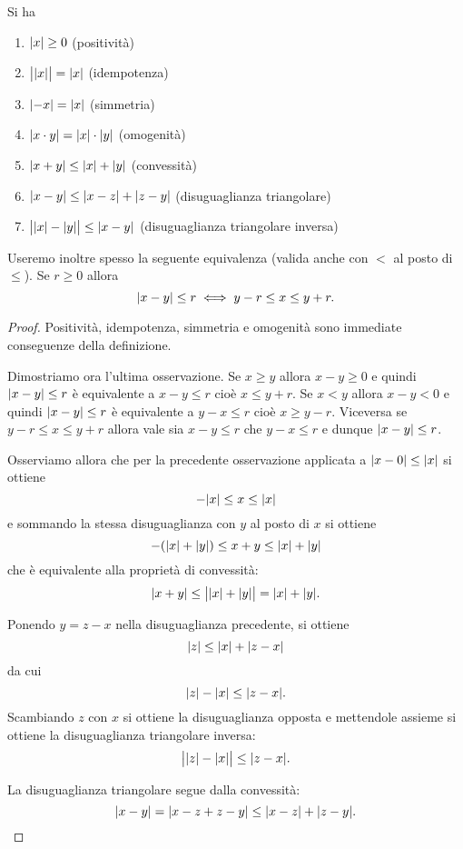 \begin{proposition}
\mymark{**}
Si ha
\begin{enumerate}
\item ${\left|x\right|}\ge 0$ (positività)
\item $\big\lvert{\left|x\right|}\big\rvert = {\left|x\right|}$ (idempotenza)
\item ${\left|-x\right|} = {\left|x\right|}$ (simmetria)
\item ${\left|x\cdot y\right|} = {\left|x\right|}\cdot {\left|y\right|}$ (omogenità)
\item ${\left|x+y\right|} \le {\left|x\right|} + {\left|y\right|}$ (convessità)
\item ${\left|x-y\right|} \le {\left|x-z\right|} + {\left|z-y\right|}$ (disuguaglianza triangolare)
\item $\big\lvert{\left|x\right|}-{\left|y\right|}\big\rvert \le {\left|x-y\right|}$ (disuguaglianza triangolare inversa)
\end{enumerate}
Useremo inoltre spesso la seguente equivalenza (valida
anche con $<$ al posto di $\le$). Se $r\ge 0$ allora
\[
  {\left|x-y\right|} \le r
  \iff
  y - r \le x \le y + r.
\]
\end{proposition}
%
\begin{proof}
\mymark{*}
Positività, idempotenza, simmetria e omogenità sono immediate conseguenze della definizione.

Dimostriamo ora l'ultima osservazione.
Se $x\ge y$ allora $x-y\ge 0$ e quindi ${\left|x-y\right|} \le r$ è
equivalente a $x-y\le r$ cioè $x\le y+r$.
Se $x<y$ allora $x-y<0$ e quindi ${\left|x-y\right|} \le r$ è
equivalente a $y-x \le r$ cioè $x\ge y-r$.
Viceversa se $y-r \le x \le y+r$ allora vale sia $x-y \le r$ che $y-x \le r$ e 
dunque ${\left|x-y\right|}\le r$.

Osserviamo allora che per la precedente osservazione applicata
a ${\left|x-0\right|} \le {\left|x\right|}$ si ottiene
\[
  -{\left|x\right|} \le x \le {\left|x\right|}
\]
e sommando la stessa disuguaglianza con $y$ al posto di $x$ si
ottiene
\[
  -({\left|x\right|} + {\left|y\right|}) \le x + y \le {\left|x\right|} + {\left|y\right|}
\]
che è equivalente alla proprietà di convessità:
\[
  {\left|x+y\right|} \le \big\lvert{\left|x\right|} + {\left|y\right|}\big\rvert = {\left|x\right|} + {\left|y\right|}.
\]

Ponendo $y=z-x$ nella disuguaglianza precedente, si ottiene
\[
  {\left|z\right|} \le {\left|x\right|} + {\left|z-x\right|}
\]
da cui
\[
  {\left|z\right|} - {\left|x\right|} \le {\left|z-x\right|}.
\]
Scambiando $z$ con $x$ si ottiene la disuguaglianza opposta
e mettendole assieme si ottiene
la disuguaglianza triangolare inversa:
\[
\big\lvert {\left|z\right|}-{\left|x\right|} \big\rvert  \le {\left|z-x\right|}.
\]

La disuguaglianza triangolare segue dalla convessità:
\[
  {\left|x-y\right|} = {\left|x-z + z-y\right|} \le {\left|x-z\right|} + {\left|z-y\right|}.
\]
\end{proof}

